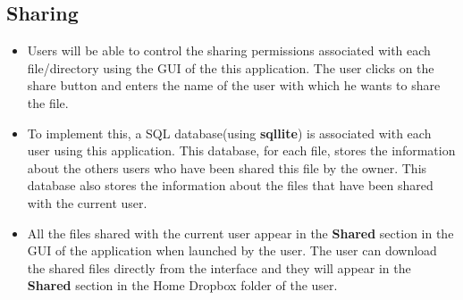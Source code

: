 \documentclass[11pt,fleqn]{book} %
\begin{document}
\subsection{Sharing}
\begin{itemize}
\item Users will be able to control the sharing permissions associated with each file/directory using the GUI of the this application. The user clicks on the share button and enters the name of the user with which he wants to share the file.
\item To implement this, a SQL database(using \textbf{sqllite}) is associated with each user using this application. This database, for each file, stores the information about the others users who have been shared this file by the owner. This database also stores the information about the files that have been shared with the current user. 
\item All the files shared with the current user appear in the \textbf{Shared} section in the GUI of the application when launched by the user. The user can download the shared files directly from the interface and they will appear in the \textbf{Shared} section in the Home Dropbox folder of the user.
\end{itemize}
\end{document}
